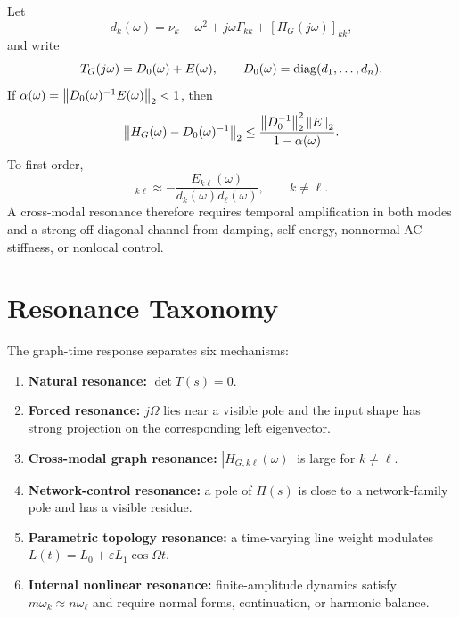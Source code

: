 Let
\begin{equation}
  d_k(\omega)
  =
  \nu_k-\omega^2
  +j\omega\Gamma_{kk}
  +[\Pi_G(j\omega)]_{kk},
  \label{eq:graph_dk}
\end{equation}
and write
\begin{equation}
  T_G(j\omega)=D_0(\omega)+E(\omega),
  \qquad
  D_0(\omega)=\operatorname{diag}(d_1,\ldots,d_n).
  \label{eq:graph_TG_split}
\end{equation}
If \(\alpha(\omega)=\left\lVert D_0(\omega)^{-1}E(\omega) \right\rVert_2<1\), then
\begin{equation}
  \left\lVert H_G(\omega)-D_0(\omega)^{-1} \right\rVert_2
  \le
  \frac{\left\lVert D_0^{-1} \right\rVert_2^2\left\lVert E \right\rVert_2}{1-\alpha(\omega)}.
  \label{eq:graph_cross_resonance_bound}
\end{equation}
To first order,
\begin{equation}
  [H_G(\omega)]_{k\ell}
  \approx
  -\frac{E_{k\ell}(\omega)}{d_k(\omega)d_\ell(\omega)},
  \qquad k\ne\ell.
  \label{eq:graph_cross_resonance_first_order}
\end{equation}
A cross-modal resonance therefore requires temporal amplification in both
modes and a strong off-diagonal channel from damping, self-energy, nonnormal
AC stiffness, or nonlocal control.

\section{Resonance Taxonomy}

The graph-time response separates six mechanisms:
\begin{enumerate}
\item \textbf{Natural resonance:} \(\det T(s)=0\).
\item \textbf{Forced resonance:} \(j\Omega\) lies near a visible pole and the
input shape has strong projection on the corresponding left eigenvector.
\item \textbf{Cross-modal graph resonance:} \(|H_{G,k\ell}(\omega)|\) is large
for \(k\ne\ell\).
\item \textbf{Network-control resonance:} a pole of \(\Pi(s)\) is close to a
network-family pole and has a visible residue.
\item \textbf{Parametric topology resonance:} a time-varying line weight
modulates \(L(t)=L_0+\varepsilon L_1\cos\Omega t\).
\item \textbf{Internal nonlinear resonance:} finite-amplitude dynamics satisfy
\(m\omega_k\approx n\omega_\ell\) and require normal forms, continuation, or
harmonic balance.
\end{enumerate}

